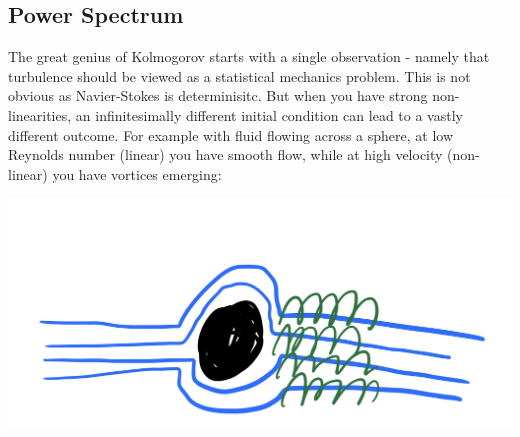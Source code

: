 \subsection{Power Spectrum}
The great genius of Kolmogorov starts with a single observation - namely that turbulence should be viewed as a statistical mechanics problem. This is not obvious as Navier-Stokes is determinisitc. But when you have strong non-linearities, an infinitesimally different initial condition can lead to a vastly different outcome. For example with fluid flowing across a sphere, at low Reynolds number (linear) you have smooth flow, while at high velocity (non-linear) you have vortices emerging:

\begin{center}
    \includegraphics[scale=0.35]{Lectures/Images/lec11-fluidsphere.png}
\end{center}

